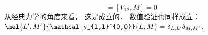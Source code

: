 
\begin{equation}
[V_{12}, L^2] = [V_{12}, M] = 0
\end{equation}
从经典力学的角度来看， 这是成立的． 数值验证也同样成立： $\mel{L',M'}{\mathcal y_{l,l}^{0,0}}{L,M} = \delta_{L,L'}\delta_{M,M'}$．
